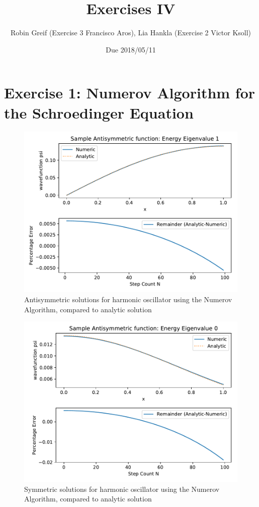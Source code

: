 \documentclass[12pt,a4paper,twoside]{article}
\title{Exercises IV}
\author{Robin Greif (Exercise 3 Francisco Aros), Lia Hankla (Exercise 2 Victor Ksoll)}
\date{Due 2018/05/11}
\begin{document}
\maketitle

\section{Exercise 1: Numerov Algorithm for the Schroedinger Equation}

\begin{figure}[h!]
  \centering
  \includegraphics[width=.9\textwidth]{../exercise4_problem1_antisymEx.pdf}
  \caption{Antisymmetric solutions for harmonic oscillator using the Numerov Algorithm, compared to analytic solution} 
  \label{fig:1a}
\end{figure}

\begin{figure}[h!]
  \centering
  \includegraphics[width=.9\textwidth]{../exercise4_problem1_symEx.pdf}
  \caption{Symmetric solutions for harmonic oscillator using the Numerov Algorithm, compared to analytic solution} 
  \label{fig:1b}
\end{figure}
\end{document}
